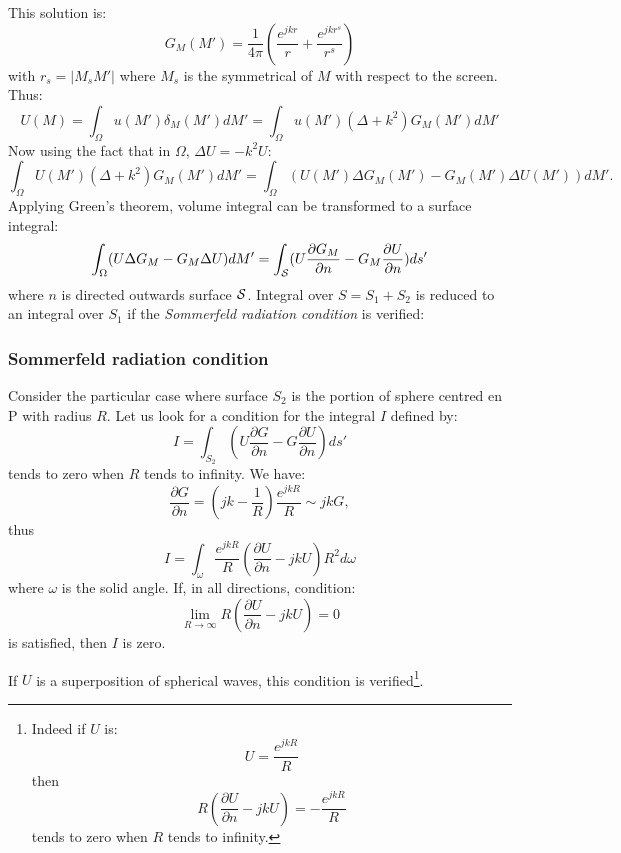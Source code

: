 \documentclass[12pt]{book}
\begin{document}
This solution is:
\begin{equation}\label{eqgreendif}
G_M(M')=\frac{1}{4\pi}(\frac{e^{jkr}}{r}+\frac{e^{jkr^s}}{r^s})
\end{equation}
with $r_s=|M_sM'|$ where $M_s$ is the symmetrical of $M$ with respect to the
screen. Thus:
\begin{equation}
U(M)=\int_\Omega u(M')\delta_M(M') dM'=\int_\Omega
u(M')(\Delta+k^2)G_M(M')dM' 
\end{equation}
Now using the fact that in $\Omega$, $\Delta U=-k^2U$:
\begin{equation}
\int_{\Omega}U(M')(\Delta+k^2)G_M(M') dM'=\int_{\Omega}(U(M')\Delta
G_M(M')-G_M(M')\Delta U(M')) dM'.
\end{equation}
Applying Green's theorem, volume integral can be transformed to a surface
integral:
\begin{equation}
\int_{\Omega}(U\Delta G_M-G_M\Delta U) dM'=\int_{\cal S}(U\frac{\partial
 G_M}{\partial n}-G_M\frac{\partial U}{\partial n}) ds'
\end{equation}
where $n$ is directed outwards surface ${\cal S}$.
Integral over $S=S_1+S_2$ is reduced to an integral over
$S_1$  if the {\it Sommerfeld radiation condition}
 is verified:
\subsubsection{Sommerfeld radiation condition}
Consider the particular case where surface $S_2$ is the portion of sphere
centred en P with radius $R$. Let us look for a condition for the integral $I$
defined by:
\begin{equation}
I=\int_{S_2}(U\frac{\partial G}{\partial n}-G\frac{\partial
U}{\partial n}) ds'
\end{equation}
tends to zero when $R$ tends to infinity. We have:
\begin{equation}
\frac{\partial G}{\partial n}=(jk-\frac{1}{R})\frac{e^{jkR}}{R}\sim jkG,
\end{equation}
thus
\begin{equation}
I=\int_{\omega}\frac{e^{jkR}}{R}(\frac{\partial U}{\partial n}-jkU)R^2
d\omega
\end{equation}
where $\omega$ is the solid angle. If, in all directions, condition:
\begin{equation}
\lim_{R\rightarrow\infty}R(\frac{\partial U}{\partial n}-jkU)=0
\end{equation}
is satisfied, then $I$ is zero.
\begin{rem}
If $U$ is a superposition of spherical waves, this condition is
verified\footnote{%
Indeed if $U$ is:
\begin{equation}
U=\frac{e^{jkR}}{R}
\end{equation}
then
\begin{equation}
R(\frac{\partial U}{\partial n}-jkU)=-\frac{e^{jkR}}{R}
\end{equation}
tends to zero when $R$ tends to infinity.
}.
\end{rem}
\end{document}
